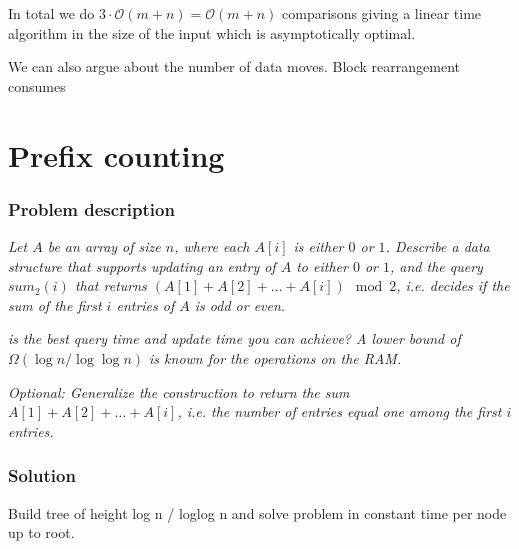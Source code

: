 \documentclass[a4paper,oneside,article,11pt]{memoir}
\begin{document}
In total we do $3\cdot\mathcal{O}(m+n) = \mathcal{O}(m+n)$ comparisons giving a linear time algorithm in the size of the input which is asymptotically optimal.

We can also argue about the number of data moves. Block rearrangement consumes 

\chapter{Prefix counting}
\label{chp:prefix}
\subsection{Problem description}
\textit{Let $A$ be an array of size $n$, where each $A\left[i\right]$ is either $0$ or $1$. Describe a data structure that supports updating an entry of $A$ to either $0$ or $1$, and the query $sum_2\left(i\right)$ that returns $\left(A\left[1\right]+A\left[2\right]+\dots+A\left[i\right]\right) \mod 2$, i.e. decides if the sum of the first $i$ entries of $A$ is odd or even.}

\textit{ is the best query time and update time you can achieve? A lower bound of $\Omega(\log n/\log\log n)$ is known for the operations on the RAM.}

\textit{Optional: Generalize the construction to return the sum $A[1]+A[2]+\dots+A[i]$, i.e. the number of entries equal one among the first $i$ entries.}

\subsection{Solution}
Build tree of height log n / loglog n and solve problem in constant time per node up to root.


\end{document}
